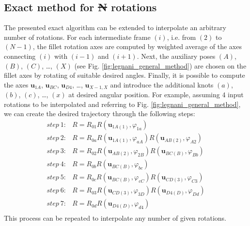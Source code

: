\documentclass[preprint, 12pt]{elsarticle}
\def\vect#1{{\boldsymbol{#1}}}
\providecommand{\DIFadd}[1]{{\protect\color{blue}\uwave{#1}}} %
\providecommand{\DIFdel}[1]{{\protect\color{red}\sout{#1}}}                      %
\providecommand{\DIFaddbegin}{} %
\providecommand{\DIFaddend}{} %
\providecommand{\DIFdelbegin}{} %
\providecommand{\DIFdelend}{} %
\begin{document}
\DIFdelend \subsection{Exact method for \DIFdelbegin \DIFdel{N }\DIFdelend \DIFaddbegin \DIFadd{arbitrary number of }\DIFaddend rotations}
\DIFaddbegin \label{subsec:connetti_esatto_general}
\DIFaddend The presented exact algorithm can be extended to interpolate an arbitrary number of rotations. For each intermediate frame $(i)$, i.e. from $(2)$ to $(N-1)$, the fillet rotation axes are computed by weighted average of the axes connecting $(i)$ with $(i-1)$ and $(i+1)$. Next, the auxiliary poses $(A)$, $(B)$, $(C)$, \ldots, $(X)$ (see Fig. \ref{fig:legnani_general_method}) are chosen on the fillet axes by rotating of suitable desired angles. Finally, it is possible to compute the axes $\vect{u}_{1A}$, $\vect{u}_{BC}$, $\vect{u}_{D4}$, \ldots, $\vect{u}_{X-1, X}$ and introduce the additional knots $(a)$, $(b)$, $(c)$, \ldots, $(x)$ at desired angular position. For example, assuming 4 input rotations to be interpolated and referring to Fig. \ref{fig:legnani_general_method}, we can create the desired trajectory through the following steps:
\begin{equation}
    \begin{array}{ll}
        step\ 1: & R = R_{01} R(\vect{u}_{1A(1)}, \varphi_{1a})\\

        step\ 2: & R = R_{0a} R(\vect{u}_{1A(1)}, \varphi_{aA}) R(\vect{u}_{AB(2)}, \varphi_{A2})\\

        step\ 3: & R = R_{02} R(\vect{u}_{AB(2)}, \varphi_{2B}) R(\vect{u}_{BC(B)}, \varphi_{Bb})\\

        step\ 4: & R = R_{0b} R(\vect{u}_{BC(B)}, \varphi_{bc})\\

        step\ 5: & R = R_{0c} R(\vect{u}_{BC(B)}, \varphi_{cC}) R(\vect{u}_{CD(3)}, \varphi_{C3})\\

        step\ 6: & R = R_{03} R(\vect{u}_{CD(3)}, \varphi_{3D}) R(\vect{u}_{D4(D)}, \varphi_{Dd})\\

        step\ 7: & R = R_{0d} R(\vect{u}_{D4(D)}, \varphi_{d4})\\
    \end{array}
\end{equation}
This process can be repeated to interpolate any number of given rotations.
\end{document}
